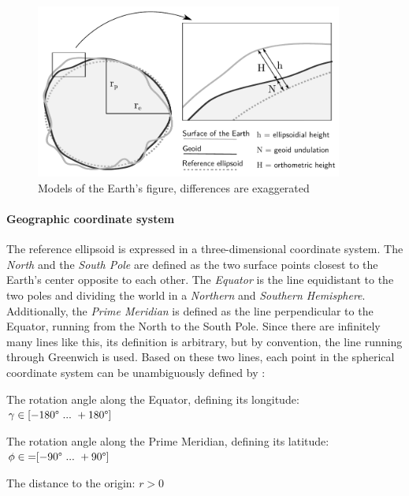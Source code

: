 \begin{figure}[H]
  \centering
  \includegraphics[width=0.9\textwidth]{graphics/basics/hgis/earth_models}
  \caption{Models of the Earth's figure, differences are exaggerated \cite[Fig. 3-6, p. 75]{bolstad2008gis}}
  \label{fig:geoid}
\end{figure}


\paragraph{Geographic coordinate system} %
\label{ssub:geographic_coordinate_system}

The reference ellipsoid is expressed in a three-dimensional coordinate system. The \emph{North} and the \emph{South Pole} are defined as the two surface points closest to the Earth's center opposite to each other. The \emph{Equator} is the line equidistant to the two poles and dividing the world in a \emph{Northern} and \emph{Southern Hemisphere}. Additionally, the \emph{Prime Meridian} is defined as the line perpendicular to the Equator, running from the North to the South Pole. Since there are infinitely many lines like this, its definition is arbitrary, but by convention, the line running through Greenwich is used. Based on these two lines, each point in the spherical coordinate system can be unambiguously defined by
\cite[pp. 26-28]{bolstad2008gis}:

\begin{compactenum}
  \item The rotation angle along the Equator, defining its longitude: $\gamma \in [-180\degree ~...~ +180\degree]$
  \item The rotation angle along the Prime Meridian, defining its latitude: $\phi \in{=} [-90\degree ~...~ +90\degree]$
  \item The distance to the origin: $r > 0$
\end{compactenum}

